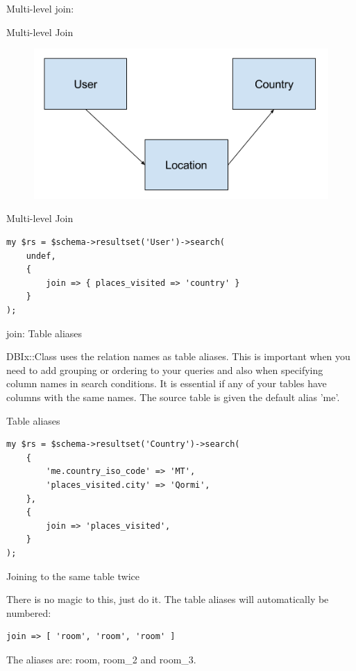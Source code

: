 Multi-level join:

\begin{frame}[fragile]{Multi-level Join}
\begin{figure}[!ht]
\centering
\includegraphics[width=1\linewidth]{img/join-multi-level.png}
\end{figure}
\end{frame}

\begin{frame}[fragile]{Multi-level Join}
\begin{lstlisting}
my $rs = $schema->resultset('User')->search(
    undef,
    {
        join => { places_visited => 'country' }
    }
);
\end{lstlisting}
\end{frame}

join: Table aliases

DBIx::Class uses the relation names as table aliases. This is important when
you need to add grouping or ordering to your queries and also when
specifying column names in search conditions. It is essential if any of your
tables have columns with the same names. The source table is given the
default alias 'me'.

\begin{frame}[fragile]{Table aliases}
\begin{lstlisting}
my $rs = $schema->resultset('Country')->search(
    {
        'me.country_iso_code' => 'MT',
        'places_visited.city' => 'Qormi',
    },
    {
        join => 'places_visited',
    }
);
\end{lstlisting}
\end{frame}

\begin{frame}[fragile]{Joining to the same table twice}

There is no magic to this, just do it. The table aliases will automatically
be numbered:

\begin{lstlisting}
join => [ 'room', 'room', 'room' ]
\end{lstlisting}

The aliases are: room, room\_2 and room\_3.
\end{frame}

